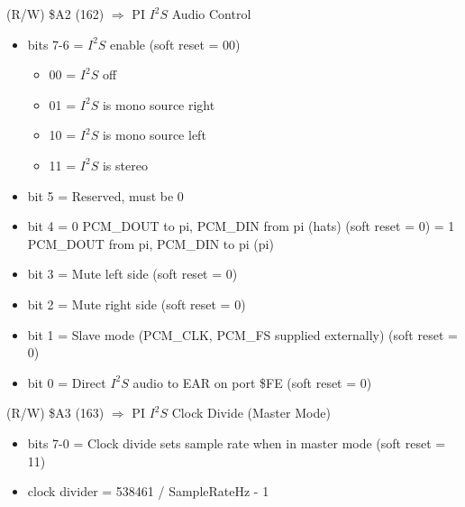 (R/W) \$A2 (162) $\Rightarrow$ PI $I^2S$ Audio Control
\begin{itemize}
\item bits 7-6 = $I^2S$ enable (soft reset = 00)
  \begin{itemize}
  \item 00 = $I^2S$ off
  \item 01 = $I^2S$ is mono source right
  \item 10 = $I^2S$ is mono source left
  \item 11 = $I^2S$ is stereo
  \end{itemize}
\item bit 5 = Reserved, must be 0
\item bit 4 = 0 PCM\_DOUT to pi, PCM\_DIN from pi (hats) (soft reset
  = 0) = 1 PCM\_DOUT from pi, PCM\_DIN to pi (pi)
\item bit 3 = Mute left side (soft reset = 0)
\item bit 2 = Mute right side (soft reset = 0)
\item bit 1 = Slave mode (PCM\_CLK, PCM\_FS supplied externally)
  (soft reset = 0)
\item bit 0 = Direct $I^2S$ audio to EAR on port \$FE (soft reset = 0)
\end{itemize}

(R/W) \$A3 (163) $\Rightarrow$ PI $I^2S$ Clock Divide (Master Mode)
\begin{itemize}
\item bits 7-0 = Clock divide sets sample rate when in master mode
  (soft reset = 11)
\item[] clock divider = 538461 / SampleRateHz - 1
\end{itemize}
